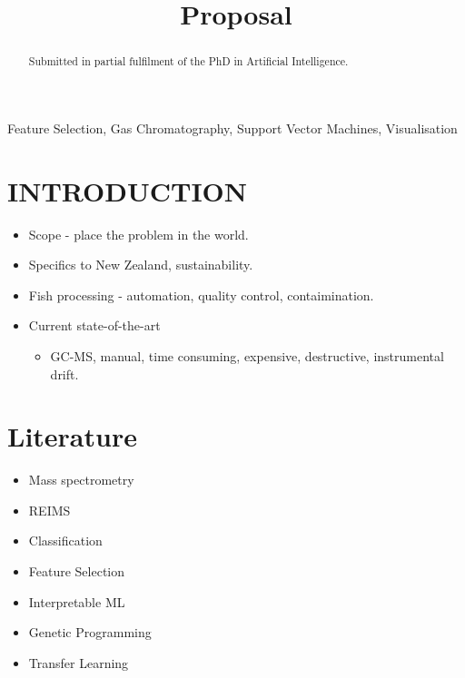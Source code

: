 \documentclass{article}
\title{Proposal}
\begin{document}
\maketitle
%
\begin{abstract}

  Submitted in partial fulfilment of the PhD in Artificial Intelligence.

\end{abstract}
%
\begin{keywords}
  Feature Selection, Gas Chromatography, Support Vector Machines, Visualisation
\end{keywords}
%

\section{INTRODUCTION}
\label{sec:introduction}

\begin{itemize}
  \item Scope - place the problem in the world. 
  \item Specifics to New Zealand, sustainability. 
  \item Fish processing - automation, quality control, contaimination. 
  \item Current state-of-the-art
  \begin{itemize}
    \item GC-MS, manual, time consuming, expensive, destructive, instrumental drift. 
  \end{itemize}
\end{itemize}

\section{Literature}
\label{sec:literature} 

\begin{itemize}
  \item Mass spectrometry \cite{eder1995gas}
  \item REIMS 
  \item Classification 
  \item Feature Selection 
  \item Interpretable ML 
  \item Genetic Programming 
  \item Transfer Learning 
\end{itemize}
\end{document}
